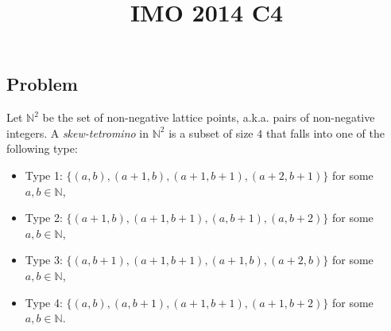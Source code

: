\documentclass{article}
\title{IMO 2014 C4}
\author{}
\date{}
\newcommand{\N}{\mathbb{N}}
\begin{document}
\maketitle



\subsection*{Problem}

Let $\N^2$ be the set of non-negative lattice points, a.k.a. pairs of non-negative integers.
A \emph{skew-tetromino} in $\N^2$ is a subset of size $4$ that falls into one of the following type:
\begin{itemize}
    \item   Type 1: $\{(a, b), (a + 1, b), (a + 1, b + 1), (a + 2, b + 1)\}$ for some $a, b \in \N$,
    \item   Type 2: $\{(a + 1, b), (a + 1, b + 1), (a, b + 1), (a, b + 2)\}$ for some $a, b \in \N$,
    \item   Type 3: $\{(a, b + 1), (a + 1, b + 1), (a + 1, b), (a + 2, b)\}$ for some $a, b \in \N$,
    \item   Type 4: $\{(a, b), (a, b + 1), (a + 1, b + 1), (a + 1, b + 2)\}$ for some $a, b \in \N$.
\end{itemize}
\end{document}

